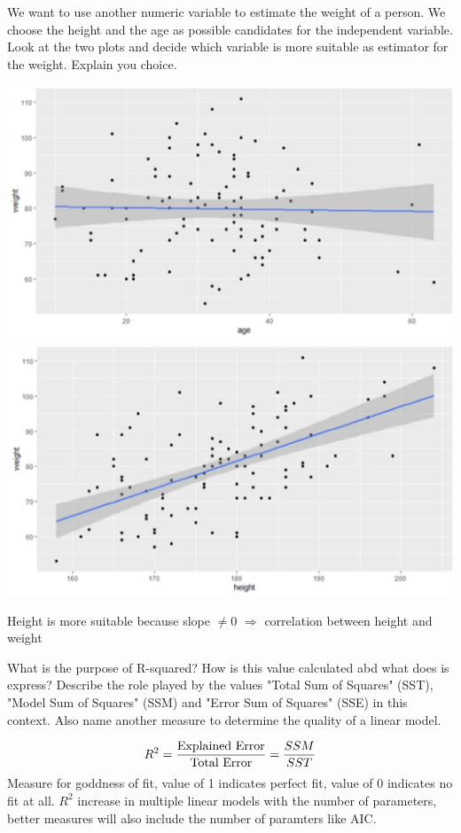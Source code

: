 \documentclass[addpoints]{exam}
\begin{document}
\begin{questions}
		\question[3\half] We want to use another numeric variable to estimate the weight of a person. We choose the height and the age as possible candidates for the independent variable. Look at the two plots and decide which variable is more suitable as estimator for the weight. Explain you choice.
		\begin{center}
			\includegraphics[scale=0.5]{plot1.png}
			\includegraphics[scale=0.5]{plot2.png}
		\end{center}
		\begin{solution}
			Height is more suitable because slope $\neq 0$ $\Rightarrow$ correlation between height and weight
		\end{solution}
	
		\question[4] What is the purpose of R-squared? How is this value calculated abd what does is express? Describe the role played by the values "Total Sum of Squares" (SST), "Model Sum of Squares" (SSM) and "Error Sum of Squares" (SSE) in this context. Also name another measure to determine the quality of a linear model. 
		\begin{solution}
				\begin{align}
					R^2 = \frac{\text{Explained Error}}{\text{Total Error}} = \frac{SSM}{SST} \notag
				\end{align}
				Measure for goddness of fit, value of 1 indicates perfect fit, value of 0 indicates no fit at all. $R^2$ increase in multiple linear models with the number of parameters, better measures will also include the number of paramters like AIC.
		\end{solution}
	

\end{questions}
\end{document}
